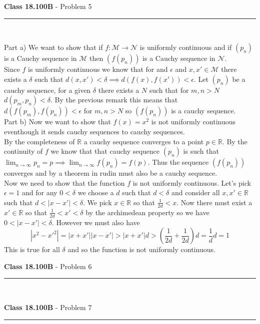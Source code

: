 \documentclass[11pt,reqno]{article}
\begin{document}
\vspace{15pt}
\begin{flushleft} 
\textbf{Class 18.100B} - Problem 5\\
\rule{500pt}{1pt}\\
\end{flushleft} 

\noindent Part a) We want to show that if $f: \mathcal{M} \to \mathcal{N}$ is uniformly continuous and if $(p_n)$ is a Cauchy sequence in $\mathcal{M}$ then $(f(p_n))$ is a Cauchy sequence in $\mathcal{N}$.\\
\indent Since $f$ is uniformly continuous we know that for and $\epsilon$ and $x, x' \in \mathcal{M}$ there exists a $\delta$ such that $d(x,x') < \delta \implies d(f(x),f(x')) < \epsilon$. Let $(p_n)$ be a cauchy sequence, for a given $\delta$ there exists a $N$ such that for $m,n > N$ $d(p_m,p_n) < \delta$. By the previous remark this means that $d(f(p_m),f(p_n)) < \epsilon$ for $m,n > N$ so $(f(p_n))$ is a cauchy sequence. \\

\noindent Part b) Now we want to show that $f(x) = x^2$ is not uniformly continuous eventhough it sends cauchy sequences to cauchy sequences.\\
\indent By the completeness of $\mathbb{R}$ a cauchy sequence converges to a point $p \in \mathbb{R}$. By the continuity of $f$ we know that that cauchy sequence $(p_n)$ is such that $\lim_{n \to \infty} p_n = p \implies \lim_{n \to \infty} f(p_n) = f(p)$. Thus the sequence $(f(p_n))$ converges and by a theorem in rudin must also be a cauchy sequence.\\
\indent Now we need to show that the function $f$ is not uniformly continuous. Let's pick $\epsilon = 1$ and for any $0 < \delta$ we choose a $d$ such that $d < \delta$ and consider all $x,x' \in \mathbb{R}$ such that $d < |x-x'| < \delta$. We pick $x \in \mathbb{R}$ so that $\frac{1}{2d} < x$. Now there must exist a $x' \in \mathbb{R}$ so that $\frac{1}{2d} < x' < \delta$ by the archimedean property so we have $0 < |x - x'| < \delta$. However we must also have \[|x^2 - x'^2| = |x+x'||x-x'| > |x+x'|d > (\frac{1}{2d}+\frac{1}{2d})d = \frac{1}{d}d = 1\]
This is true for all $\delta$ and so the function is not uniformly continuous.

\vspace{15pt}
\begin{flushleft} 
\textbf{Class 18.100B} - Problem 6\\
\rule{500pt}{1pt}\\
\end{flushleft} 


\vspace{15pt}
\begin{flushleft} 
\textbf{Class 18.100B} - Problem 7\\
\rule{500pt}{1pt}\\
\end{flushleft} 




\end{document}
